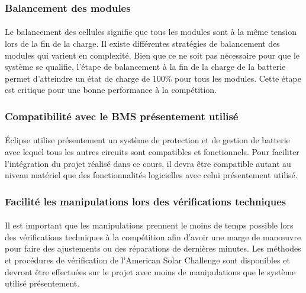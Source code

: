 	\subsubsection{Balancement des modules}
	
		\paragraph{}
		Le balancement des cellules signifie que tous les modules sont à la même tension lors de la fin de la charge. Il existe différentes stratégies de balancement des modules qui varient en complexité. Bien que ce ne soit pas nécessaire pour que le système se qualifie, l'étape de balancement à la fin de la charge de la batterie permet d'atteindre un état de charge de 100\% pour tous les modules. Cette étape est critique pour une bonne performance à la compétition. 
		
	\subsubsection{Compatibilité avec le BMS présentement utilisé}
		\paragraph{}
		Éclipse utilise présentement un système de protection et de gestion de batterie avec lequel tous les autres circuits sont compatibles et fonctionnels. Pour faciliter l'intégration du projet réalisé dans ce cours, il devra être compatible autant au niveau matériel que des fonctionnalités logicielles avec celui présentement utilisé.		
		
	\subsubsection{Facilité les manipulations lors des vérifications techniques}

		\paragraph{}
		Il est important que les manipulations prennent le moins de temps possible lors des vérifications techniques à la compétition afin d'avoir une marge de manœuvre pour faire des ajustements ou des réparations de dernières minutes. Les méthodes et procédures de vérification de l'American Solar Challenge sont disponibles et devront être effectuées sur le projet avec moins de manipulations que le système utilisé présentement.
		
